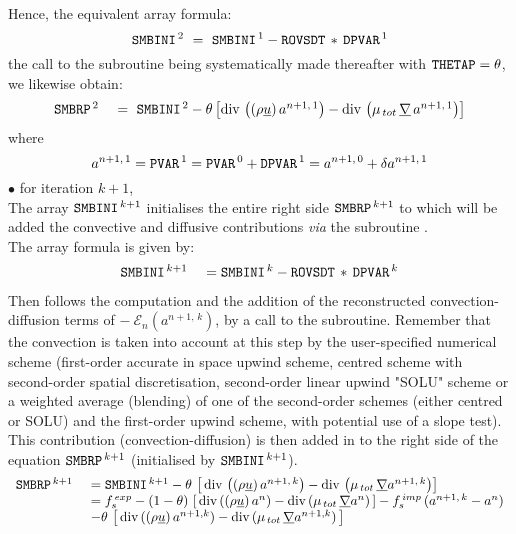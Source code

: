 \begin{itemize}
Hence, the equivalent array formula:
\begin{equation}\notag
\text{\texttt{SMBINI}}^{\,2}\ =\ \text{\texttt{SMBINI}}^{\,1} - \text{\texttt{ROVSDT}}\,*\,\text{\texttt{DPVAR}}^{\,1}
\end{equation}
the call to the subroutine  being systematically made thereafter with $\text{\texttt{THETAP}}=\theta$, we likewise obtain:
\begin{equation}\notag
\begin{array}{ll}
\var{SMBRP}^{\,2}\ &=\ \var{SMBINI}^{\,2}-\theta\left[\dive\left((\rho \underline{u})\,a^{n+1,\,1}\right)- \dive\left(\mu_{\,tot}\,\grad \,a^{n+1,\,1}\right)\right]\\
\end{array}
\end{equation}
where
\begin{equation}\notag
a^{n+1,\,1}=\text{\texttt{PVAR}}^{\,1}=\text{\texttt{PVAR}}^{\,0}+\text{\texttt{DPVAR}}^{\,1}=a^{n+1,\,0}+\delta a^{n+1,\,1}
\end{equation}
$\bullet$ for iteration $k+1$,\\
The array $\text{\texttt{SMBINI}}^{\,k+1}$ initialises the entire right side
$\text{\texttt{SMBRP}}^{\,k+1}$ to which will be added the convective and diffusive contributions
{\it via} the subroutine .\\
The array formula is given by:
\begin{equation}\notag
\begin{array}{ll}
\text{\texttt{SMBINI}}^{\,k+1}\ &= \text{\texttt{SMBINI}}^{\,k} - \text{\texttt{ROVSDT}}\,*\,\text{\texttt{DPVAR}}^{\,k}\\
\end{array}
\end{equation}
Then follows the computation and the addition of the reconstructed convection-diffusion terms of
$-\  \mathcal{E}_{n}(a^{n+1,\,k})$, by a call to the  subroutine. Remember
that the convection is taken into account at this step by the user-specified numerical scheme
(first-order accurate in space upwind scheme, centred scheme with second-order spatial discretisation, second-order
linear upwind "SOLU" scheme or a weighted average (blending) of one of the second-order schemes (either centred or SOLU) and the first-order upwind scheme, with potential use of a slope test).\\
This contribution (convection-diffusion) is then added in to the right side of the
equation  $\text{\texttt{SMBRP}}^{\,k+1}$ (initialised by $\text{\texttt{SMBINI}}^{\,k+1}$).
\begin{equation}\notag
\begin{array}{ll}
\text{\texttt{SMBRP}}^{\,k+1}\ &= \text{\texttt{SMBINI}}^{\,k+1} - \theta\,\left[\,\text{div}\,\left((\rho \underline{u})\,a^{n+1,\,k}\right)- \text{div}\,\left(\mu_{\,tot}\,\underline{\nabla} a^{n+1,\,k}\right)\right]\\
& = f_s^{\,exp}-(1-\theta)\,\left[\,\text{div}\,((\rho \underline{u})\,a^n) - \text{div}\,(\mu_{\,tot}\,\underline{\nabla} a^n)\,\right]- f_s^{\,imp}\,(a^{n+1,\,k} -a^{n}) \\
&-\theta\,\left[\,\text{div}\,((\rho \underline{u})\,a^{n+1,k}) - \text{div}\,(\mu_{\,tot}\,\underline{\nabla} a^{n+1,k})\,\right]\\
\end{array}
\end{equation}


\end{itemize}

